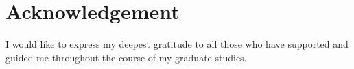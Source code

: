 \chapter*{Acknowledgement}
\thispagestyle{previous}

I would like to express my deepest gratitude to all those who have supported and guided me throughout the course of my graduate studies.

\markacknowledgement